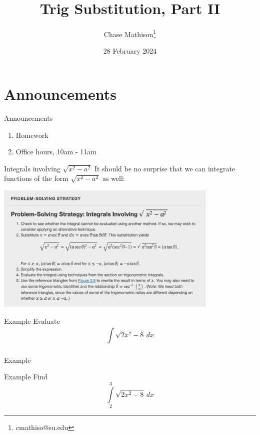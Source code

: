 \documentclass[presentation]{beamer}
\institute[SU]{Shenandoah University}
\author{Chase Mathison\thanks{cmathiso@su.edu}}
\date{28 February 2024}
\title{Trig Substitution, Part II}
\begin{document}
\maketitle

\section{Announcements}
\label{sec:org9f80f9f}
\begin{frame}[label={sec:orgd6e27f8}]{Announcements}
\begin{enumerate}
\item Homework
\item Office hours, 10am - 11am
\end{enumerate}
\end{frame}

\begin{frame}[label={sec:orgeb97ebd}]{Integrals involving \(\sqrt{x^2-a^2}\)}
It should be no surprise that we can integrate functions of the form
\(\sqrt{x^2-a^2}\) as well:

\begin{center}
\includegraphics[width=0.8\textwidth]{../img/trigSub3.png}
\end{center}
\end{frame}

\begin{frame}[label={sec:org3c35d60}]{Example}
Evaluate
\[
\int\limits_{}^{} \sqrt{2x^2 - 8}\,dx \]
\vspace{10in}
\end{frame}

\begin{frame}[label={sec:org253d8da}]{Example}
\end{frame}

\begin{frame}[label={sec:org528cd15}]{Example}
Find
\[\int\limits_2^3 \sqrt{2x^2-8}\,dx \]
\vspace{10in}
\end{frame}
\end{document}
